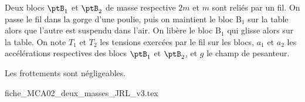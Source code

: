 \finEntrainement





\hauteurLargeurCadreReponse		{6mm}{3cm}
\typeEntrainement				{} %
\initialisationEntrainement


                                \initialisationPartieGauche %
Deux blocs $\ptB_1$ et $\ptB_2$ de masse respective $2m$ et $m$ sont reliés par un fil. %
On passe le fil dans la gorge d'une poulie, %
puis on maintient le bloc B$_{1}$ sur la table alors que l'autre est suspendu dans l'air. On libère le bloc B$_{1}$ qui glisse alors sur la table. On note $T_1$ et $T_2$ les tensions exercées par le fil sur les blocs, $a_1$ et $a_2$ les accélérations respectives des blocs $\ptB_1$ et $\ptB_2$, et $g$ le champ de pesanteur. 

Les frottements sont négligeables.
                                \initialisationPartieDroite %
\begin{center}
{fiche_MCA02_deux_masses_JRL_v3.tex}
\end{center}
                               \finalisationDuPartageDePage %


